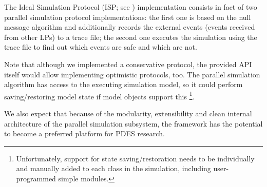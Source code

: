 The Ideal Simulation Protocol (ISP; see \cite{bagrodia00})
implementation consists in fact of two parallel simulation
protocol implementations:
the first one is based on the null message algorithm and
additionally records the external events (events received
from other LPs) to a trace file; the second one executes
the simulation using the trace file to find out which
events are safe and which are not.

Note that although we implemented a conservative protocol,
the provided API itself would allow implementing optimistic
protocols, too. The parallel simulation algorithm has
access to the executing simulation model, so it could perform
saving/restoring model state if model objects support this
  \footnote{Unfortunately, support for state saving/restoration
  needs to be individually and manually added to each class
  in the simulation, including user-programmed simple modules.}.

We also expect that because of the modularity, extensibility and
clean internal architecture of the parallel simulation subsystem,
the {\opp} framework has the potential to become a preferred platform
for PDES research.


